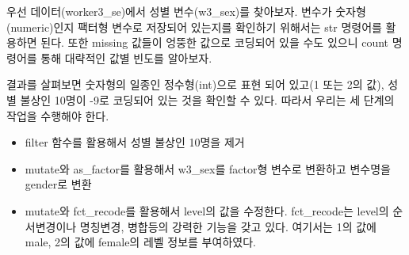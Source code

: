\documentclass[
]{book}
\newenvironment{Shaded}{\begin{snugshade}}{\end{snugshade}}
\newcommand{\AttributeTok}[1]{\textcolor[rgb]{0.77,0.63,0.00}{#1}}
\newcommand{\DecValTok}[1]{\textcolor[rgb]{0.00,0.00,0.81}{#1}}
\newcommand{\DocumentationTok}[1]{\textcolor[rgb]{0.56,0.35,0.01}{\textbf{\textit{#1}}}}
\newcommand{\FunctionTok}[1]{\textcolor[rgb]{0.00,0.00,0.00}{#1}}
\newcommand{\NormalTok}[1]{#1}
\newcommand{\OtherTok}[1]{\textcolor[rgb]{0.56,0.35,0.01}{#1}}
\newcommand{\SpecialCharTok}[1]{\textcolor[rgb]{0.00,0.00,0.00}{#1}}
\newcommand{\StringTok}[1]{\textcolor[rgb]{0.31,0.60,0.02}{#1}}
\providecommand{\tightlist}{%
  \setlength{\itemsep}{0pt}\setlength{\parskip}{0pt}}
\theoremstyle{definition}
\theoremstyle{definition}
\theoremstyle{definition}
\theoremstyle{definition}
\theoremstyle{remark}
\begin{document}
우선 데이터(worker3\_se)에서 성별 변수(w3\_sex)를 찾아보자. 변수가 숫자형(numeric)인지 팩터형 변수로 저장되어 있는지를 확인하기 위해서는 str 명령어를 활용하면 된다. 또한 missing 값들이 엉뚱한 값으로 코딩되어 있을 수도 있으니 count 명령어를 통해 대략적인 값별 빈도를 알아보자.

\begin{Shaded}
\end{Shaded}

결과를 살펴보면 숫자형의 일종인 정수형(int)으로 표현 되어 있고(1 또는 2의 값), 성별 불상인 10명이 -9로 코딩되어 있는 것을 확인할 수 있다. 따라서 우리는 세 단계의 작업을 수행해야 한다.

\begin{itemize}
\tightlist
\item
  filter 함수를 활용해서 성별 불상인 10명을 제거
\item
  mutate와 as\_factor를 활용해서 w3\_sex를 factor형 변수로 변환하고 변수명을 gender로 변환
\item
  mutate와 fct\_recode를 활용해서 level의 값을 수정한다. fct\_recode는 level의 순서변경이나 명칭변경, 병합등의 강력한 기능을 갖고 있다. 여기서는 1의 값에 male, 2의 값에 female의 레벨 정보를 부여하였다.
\end{itemize}

\begin{Shaded}
\end{Shaded}
\end{document}
